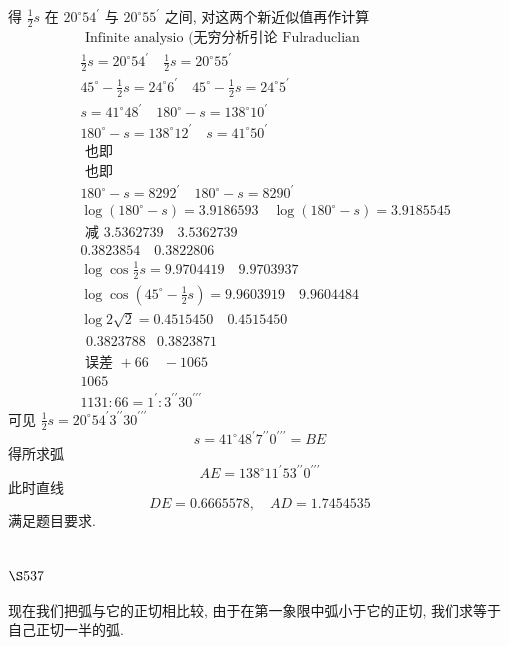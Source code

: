 得 $\frac{1}{2} s$ 在 $20^{\circ} 54^{\prime}$ 与 $20^{\circ} 55^{\prime}$ 之间, 对这两个新近似值再作计算 
\[
\begin{aligned}
& \text { Infinite analysio (无穷分析引论 Fulraduclian } \\
& \frac{1}{2} s=20^{\circ} 54^{\prime} \quad \frac{1}{2} s=20^{\circ} 55^{\prime} \\
& 45^{\circ}-\frac{1}{2} s=24^{\circ} 6^{\prime} \quad 45^{\circ}-\frac{1}{2} s=24^{\circ} 5^{\prime} \\
& s=41^{\circ} 48^{\prime} \quad 180^{\circ}-s=138^{\circ} 10^{\prime} \\
& 180^{\circ}-s=138^{\circ} 12^{\prime} \quad s=41^{\circ} 50^{\prime} \\
& \text { 也即 } \\
& \text { 也即 } \\
& 180^{\circ}-s=8292^{\prime} \quad 180^{\circ}-s=8290^{\prime} \\
& \log \left(180^{\circ}-s\right)=3.9186593 \quad \log \left(180^{\circ}-s\right)=3.9185545 \\
& \text { 减 } 3.5362739 \quad 3.5362739 \\
& 0.3823854 \quad 0.3822806 \\
& \log \cos \frac{1}{2} s=9.9704419 \quad 9.9703937 \\
& \log \cos \left(45^{\circ}-\frac{1}{2} s\right)=9.9603919 \quad 9.9604484 \\
& \log 2 \sqrt{2}=0.4515450 \quad 0.4515450 \\
& \begin{array}{ll}0.3823788 & 0.3823871\end{array} \\
& \text { 误差 }+66 \quad-1065 \\
& 1065 \\
& 1131: 66=1^{\prime}: 3^{\prime \prime} 30^{\prime \prime \prime}
\end{aligned}
\]
可见 $\frac{1}{2} s=20^{\circ} 54^{\prime} 3^{\prime \prime} 30^{\prime \prime \prime}$
\[
s=41^{\circ} 48^{\prime} 7^{\prime \prime} 0^{\prime \prime \prime}=B E
\]
得所求弧
\[
A E=138^{\circ} 11^{\prime} 53^{\prime \prime} 0^{\prime \prime \prime}
\]
此时直线
\[
D E=0.6665578, \quad A D=1.7454535
\]
满足题目要求.

\section{$\S 537$}

现在我们把弧与它的正切相比较, 由于在第一象限中弧小于它的正切, 我们求等于 自己正切一半的弧.

